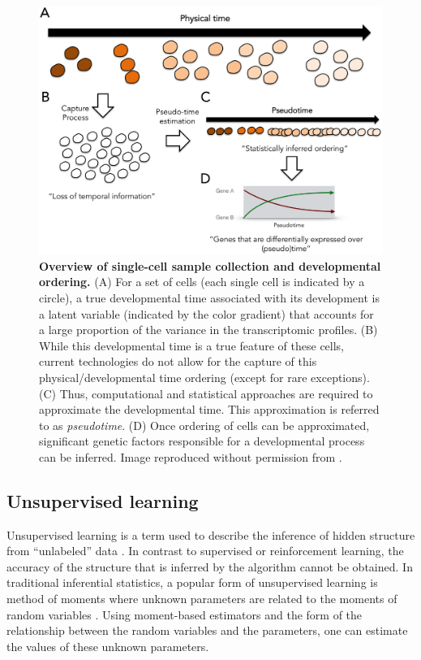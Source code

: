 \documentclass[english, 11pt]{article}\usepackage[]{graphicx}\usepackage[]{color}
\begin{document}
\begin{figure}[H]
\begin{center}
\includegraphics[scale=1.0]{images/fig1campbell.png}
\end{center}
\caption{\textbf{Overview of single-cell sample collection and developmental ordering.} (A) For a set of cells (each single cell is indicated by a circle), a true developmental time associated with its development is a latent variable (indicated by the color gradient) that accounts for a large proportion of the variance in the transcriptomic profiles. (B) While this developmental time is a true feature of these cells, current technologies do not allow for the capture of this physical/developmental time ordering (except for rare exceptions). (C) Thus, computational and statistical approaches are required to approximate the developmental time. This approximation is referred to as \textit{pseudotime}. (D) Once ordering of cells can be approximated, significant genetic factors responsible for a developmental process can be inferred. Image reproduced without permission from \cite{campbell2016order}. }
\end{figure}


\subsection{Unsupervised learning}

Unsupervised learning is a term used to describe the inference of hidden structure from ``unlabeled'' data \cite{hastie2009springer}.  In contrast to supervised or reinforcement learning, the accuracy of the structure that is inferred by the algorithm cannot be obtained.  In traditional inferential statistics, a popular form of unsupervised learning is method of moments where unknown parameters are related to the moments of random variables \cite{hastie2009springer}. Using moment-based estimators and the form of the relationship between the random variables and the parameters, one can estimate the values of these unknown parameters. 
\end{document}
